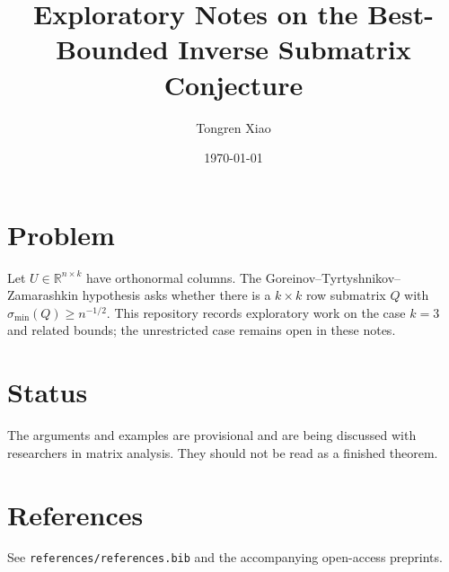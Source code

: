 \documentclass[11pt]{article}
\title{Exploratory Notes on the Best-Bounded Inverse Submatrix Conjecture}
\author{Tongren Xiao}
\date{\today}
\begin{document}
\maketitle
\section{Problem}
Let $U\in\mathbb R^{n\times k}$ have orthonormal columns. The Goreinov--Tyrtyshnikov--Zamarashkin hypothesis asks whether there is a $k\times k$ row submatrix $Q$ with $\sigma_{\min}(Q)\ge n^{-1/2}$. This repository records exploratory work on the case $k=3$ and related bounds; the unrestricted case remains open in these notes.
\section{Status}
The arguments and examples are provisional and are being discussed with researchers in matrix analysis. They should not be read as a finished theorem.
\section{References}
See \texttt{references/references.bib} and the accompanying open-access preprints.
\end{document}
